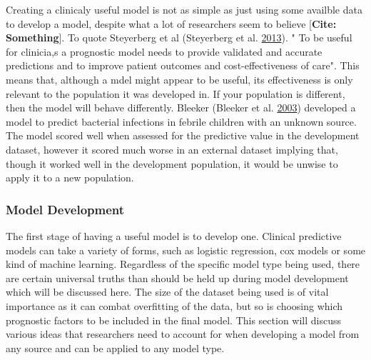 \documentclass[
]{article}
\begin{document}
Creating a clinicaly useful model is not as simple as just using some availble data to develop a model, despite what a lot of researchers seem to believe {[}\textbf{Cite: Something}{]}. To quote Steyerberg et al (Steyerberg et al. \protect\hyperlink{ref-steyerberg_prognosis_2013}{2013}). " To be useful for clinicia,s a prognostic model needs to provide validated and accurate predictions and to improve patient outcomes and cost-effectiveness of care". This means that, although a mdel might appear to be useful, its effectiveness is only relevant to the population it was developed in. If your population is different, then the model will behave differently. Bleeker (Bleeker et al. \protect\hyperlink{ref-bleeker_external_2003}{2003}) developed a model to predict bacterial infections in febrile children with an unknown source. The model scored well when assessed for the predictive value in the development dataset, however it scored much worse in an external dataset implying that, though it worked well in the development population, it would be unwise to apply it to a new population.

\hypertarget{model-development}{%
\subsubsection{Model Development}\label{model-development}}

The first stage of having a useful model is to develop one. Clinical predictive models can take a variety of forms, such as logistic regression, cox models or some kind of machine learning. Regardless of the specific model type being used, there are certain universal truths than should be held up during model development which will be discussed here. The size of the dataset being used is of vital importance as it can combat overfitting of the data, but so is choosing which prognostic factors to be included in the final model. This section will discuss various ideas that researchers need to account for when developing a model from any source and can be applied to any model type.
\end{document}
